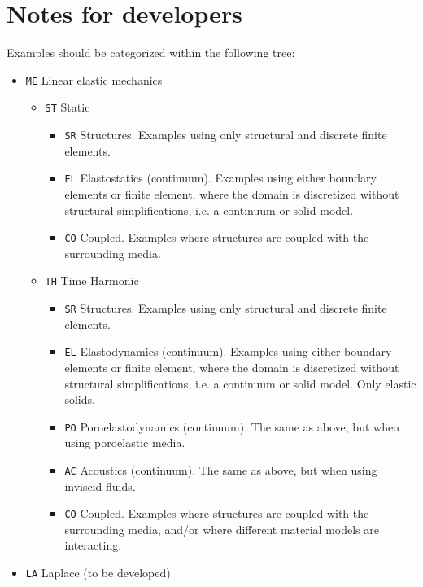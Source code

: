 \documentclass{article}
\begin{document}
\section{Notes for developers}

Examples should be categorized within the following tree:
\begin{itemize}
    \item \texttt{ME} Linear elastic mechanics
    \begin{itemize}
        \item \texttt{ST} Static
        \begin{itemize}
            \item \texttt{SR} Structures. Examples using only structural and discrete finite elements.
            \item \texttt{EL} Elastostatics (continuum). Examples using either boundary elements or finite element, where the domain is discretized without structural simplifications, i.e. a continuum or solid model.
            \item \texttt{CO} Coupled. Examples where structures are coupled with the surrounding media.
        \end{itemize}
        \item \texttt{TH} Time Harmonic
        \begin{itemize}
            \item \texttt{SR} Structures. Examples using only structural and discrete finite elements.
            \item \texttt{EL} Elastodynamics (continuum). Examples using either boundary elements or finite element, where the domain is discretized without structural simplifications, i.e. a continuum or solid model. Only elastic solids.
            \item \texttt{PO} Poroelastodynamics (continuum). The same as above, but when using poroelastic media.
            \item \texttt{AC} Acoustics (continuum). The same as above, but when using inviscid fluids.
            \item \texttt{CO} Coupled. Examples where structures are coupled with the surrounding media, and/or where different material models are interacting.
        \end{itemize}        
    \end{itemize}
    \item \texttt{LA} Laplace (to be developed)
\end{itemize}
\end{document}
